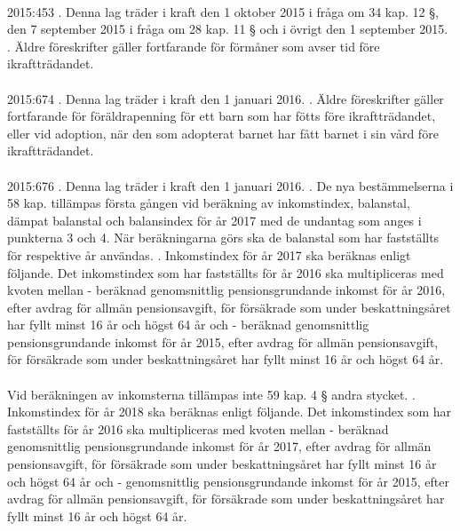 \documentclass[a4paper,notitlepage,openany,10pt]{book}
\begin{document}
\paragraph*{}
2015:453
. Denna lag träder i kraft den 1 oktober 2015 i fråga om 34 kap. 12 §, den 7 september 2015 i fråga om 28 kap. 11 § och i övrigt den 1 september 2015.
. Äldre föreskrifter gäller fortfarande för förmåner som avser tid före ikraftträdandet.
\paragraph*{}
2015:674
. Denna lag träder i kraft den 1 januari 2016.
. Äldre föreskrifter gäller fortfarande för föräldrapenning för ett barn som har fötts före ikraftträdandet, eller vid adoption, när den som adopterat barnet har fått barnet i sin vård före ikraftträdandet.
\paragraph*{}
2015:676
. Denna lag träder i kraft den 1 januari 2016.
. De nya bestämmelserna i 58 kap. tillämpas första gången vid beräkning av inkomstindex, balanstal, dämpat balanstal och balansindex för år 2017 med de undantag som anges i punkterna 3 och 4. När beräkningarna görs ska de balanstal som har fastställts för respektive år användas.
. Inkomstindex för år 2017 ska beräknas enligt följande. Det inkomstindex som har fastställts för år 2016 ska multipliceras med kvoten mellan
\newline - beräknad genomsnittlig pensionsgrundande inkomst för år 2016, efter avdrag för allmän pensionsavgift, för försäkrade som under beskattningsåret har fyllt minst 16 år och högst 64 år och
\newline - beräknad genomsnittlig pensionsgrundande inkomst för år 2015, efter avdrag för allmän pensionsavgift, för försäkrade som under beskattningsåret har fyllt minst 16 år och högst 64 år.
\paragraph*{}
Vid beräkningen av inkomsterna tillämpas inte 59 kap. 4 § andra stycket.
. Inkomstindex för år 2018 ska beräknas enligt följande. Det inkomstindex som har fastställts för år 2016 ska multipliceras med kvoten mellan
\newline - beräknad genomsnittlig pensionsgrundande inkomst för år 2017, efter avdrag för allmän pensionsavgift, för försäkrade som under beskattningsåret har fyllt minst 16 år och högst 64 år och
\newline - genomsnittlig pensionsgrundande inkomst för år 2015, efter avdrag för allmän pensionsavgift, för försäkrade som under beskattningsåret har fyllt minst 16 år och högst 64 år.
\end{document}

